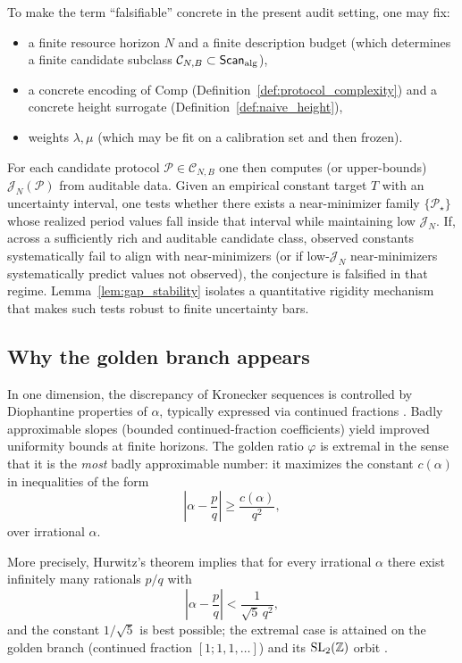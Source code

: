 To make the term ``falsifiable'' concrete in the present audit setting, one may fix:
\begin{itemize}
\item a finite resource horizon $N$ and a finite description budget (which determines a finite candidate subclass $\mathcal{C}_{N,B}\subset\mathsf{Scan}_{\mathrm{alg}}$),
\item a concrete encoding of $\mathrm{Comp}$ (Definition~\ref{def:protocol_complexity}) and a concrete height surrogate (Definition~\ref{def:naive_height}),
\item weights $\lambda,\mu$ (which may be fit on a calibration set and then frozen).
\end{itemize}
For each candidate protocol $\mathcal{P}\in\mathcal{C}_{N,B}$ one then computes (or upper-bounds) $\mathcal{J}_N(\mathcal{P})$ from auditable data.
Given an empirical constant target $T$ with an uncertainty interval, one tests whether there exists a near-minimizer family $\{\mathcal{P}_\star\}$ whose realized period values fall inside that interval while maintaining low $\mathcal{J}_N$.
If, across a sufficiently rich and auditable candidate class, observed constants systematically fail to align with near-minimizers (or if low-$\mathcal{J}_N$ near-minimizers systematically predict values not observed), the conjecture is falsified in that regime.
Lemma~\ref{lem:gap_stability} isolates a quantitative rigidity mechanism that makes such tests robust to finite uncertainty bars.

\subsection{Why the golden branch appears}
\label{sec:golden_branch}

In one dimension, the discrepancy of Kronecker sequences is controlled by Diophantine properties of $\alpha$, typically expressed via continued fractions \cite{KuipersNiederreiter1974,IosifescuKraaikamp2002}. Badly approximable slopes (bounded continued-fraction coefficients) yield improved uniformity bounds at finite horizons. The golden ratio $\varphi$ is extremal in the sense that it is the \emph{most} badly approximable number: it maximizes the constant $c(\alpha)$ in inequalities of the form
\[
\left|\alpha-\frac{p}{q}\right|\ge \frac{c(\alpha)}{q^2},
\]
over irrational $\alpha$.

More precisely, Hurwitz's theorem implies that for every irrational $\alpha$ there exist infinitely many rationals $p/q$ with
\[
\left|\alpha-\frac{p}{q}\right|<\frac{1}{\sqrt{5}\,q^2},
\]
and the constant $1/\sqrt{5}$ is best possible; the extremal case is attained on the golden branch (continued fraction $[1;1,1,\dots]$) and its $\mathrm{SL}_2(\mathbb{Z})$ orbit \cite{HardyWright2008,IosifescuKraaikamp2002}.

